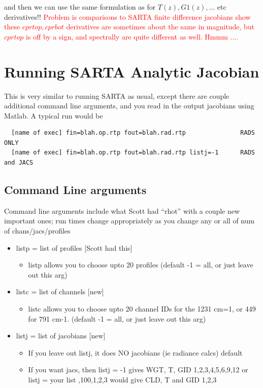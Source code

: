 \documentclass[11pt]{article}
\newcommand{\sa}{\textsf{SARTA}\xspace}
\begin{document}
and then we can use the same formulation as for $T(z),G1(z),...$ etc
derivatives!! \textcolor{red}{Problem is comparisons to \sa finite difference
jacobians show these $cprtop,cprbot$ derivatives are sometimes about the same in
magnitude, but $cprtop$ is off by a sign, and spectrally are quite different
as well. Hmmm ....}

\section{Running SARTA Analytic Jacobian}

This is very similar to running \sa as usual, except there are couple
additional command line arguments, and you read in the output
jacobians using Matlab. A typical run would be \newline

\begin{verbatim}
  [name of exec] fin=blah.op.rtp fout=blah.rad.rtp               RADS ONLY
  [name of exec] fin=blah.op.rtp fout=blah.rad.rtp listj=-1      RADS and JACS
\end{verbatim}

\subsection{Command Line arguments}

Command line arguments include what Scott had \eg ``rhot'' with a
couple new important ones; run times change appropriately as you
change any or all of num of chans/jacs/profiles

\begin{itemize}
\item   listp = list of profiles [Scott had this]
  \begin{itemize}
  \item listp allows you to choose upto 20 profiles (default -1 = all, or just
  leave out this arg)
  \end{itemize}  
\item   listc = list of channels [new]
  \begin{itemize}
  \item listc allows you to choose upto 20 channel IDs  for the 1231
  cm=1, or 449 for 791 cm-1. (default -1 = all, or just leave out this arg)
  \end{itemize}
\item   listj = list of jacobians [new]
  \begin{itemize}
  \item If you leave out listj, it does NO jacobians (ie radiance calcs) default

  \item If you want jacs, then listj = -1 gives WGT, T, GID 1,2,3,4,5,6,9,12
                                or listj = your list ,100,1,2,3    would give CLD, T and GID 1,2,3
  \end{itemize}
\end{itemize}
\end{document}
